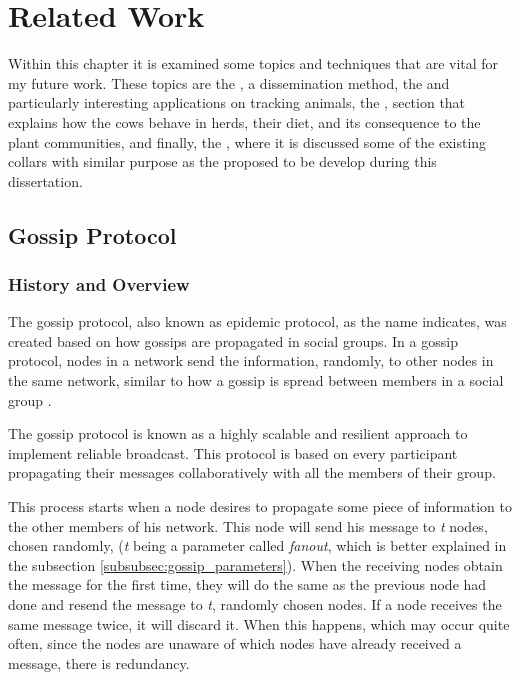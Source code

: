 
%

\chapter{Related Work}
\label{cha:related_work}
Within this chapter it is examined some topics and techniques that are vital for my future
work. These topics are the , a dissemination method, the
 and particularly interesting applications on tracking
animals, the , section that explains how the cows behave in herds, their
diet, and its consequence to the plant communities, and finally, the ,
where it is discussed some of the existing collars with similar purpose as the proposed to be
develop during this dissertation.

\section{Gossip Protocol}
\label{sec:gossip_protocol}

\subsection{History and Overview}
\label{subsec:gossip_history_overview}
The gossip protocol, also known as epidemic protocol, as the name indicates, was created
based on how gossips are propagated in social groups. In a gossip protocol, nodes in a
network send the information, randomly, to other nodes in the same network, similar to how a
gossip is spread between members in a social group \cite{Leitao2007}.

The gossip protocol is known as a highly scalable and resilient approach to implement
reliable broadcast. This protocol is based on every participant propagating their messages
collaboratively with all the members of their group.

This process starts when a node desires to propagate some piece of information to the other
members of his network. This node will send his message to \textit{t} nodes, chosen randomly,
(\textit{t} being a parameter called \textit{fanout}, which is better explained in the subsection
\ref{subsubsec:gossip_parameters}). When the receiving nodes obtain the message for the first
time, they will do the same as the previous node had done and resend the message to \textit{t},
randomly chosen nodes. If a node receives the same message twice, it will discard it. When
this happens, which may occur quite often, since the nodes are unaware of which nodes have
already received a message, there is redundancy.

